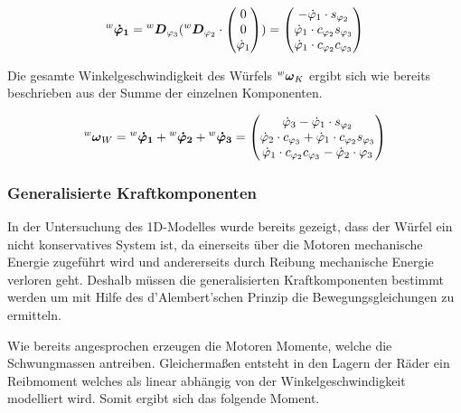 \begin{equation}
\prescript{w}{}{}\boldsymbol{\dot{\varphi}_1} = 
\prescript{w}{}{}\boldsymbol{D}_{\varphi_3} (
\prescript{w}{}{}\boldsymbol{D}_{\varphi_2} \cdot \begin{pmatrix}
 0 \\ 0 \\ \dot{\varphi}_1
\end{pmatrix} ) 
=
\begin{pmatrix}
-\dot{\varphi}_1 \cdot s_{\varphi_2}  \\
\dot{\varphi}_1 \cdot c_{\varphi_2} s_{\varphi_3} \\
\dot{\varphi}_1 \cdot c_{\varphi_2} c_{\varphi_3}
\end{pmatrix}
\end{equation}

Die gesamte Winkelgeschwindigkeit des Würfels $\prescript{w}{}{}\boldsymbol{\omega}_K$ ergibt sich wie bereits beschrieben aus der Summe der einzelnen Komponenten.

\begin{equation}
\prescript{w}{}{}\boldsymbol{\omega}_W = \prescript{w}{}{}\boldsymbol{\dot{\varphi}_1} + \prescript{w}{}{}\boldsymbol{\dot{\varphi}_2} + \prescript{w}{}{}\boldsymbol{\dot{\varphi}_3} =
\begin{pmatrix}
\dot{\varphi}_3 - \dot{\varphi}_1 \cdot s_{\varphi_2} \\
\dot{\varphi}_2 \cdot c_{\varphi_3} + \dot{\varphi}_1 \cdot c_{\varphi_2}s_{\varphi_3} \\
\dot{\varphi}_1 \cdot c_{\varphi_2}c_{\varphi_3} - \dot{\varphi}_2 \cdot{\varphi_3}
\end{pmatrix}
\end{equation}



\subsubsection{Generalisierte Kraftkomponenten}
In der Untersuchung des 1D-Modelles wurde bereits gezeigt, dass der Würfel ein nicht konservatives System ist, da einerseits über die Motoren mechanische Energie zugeführt wird und andererseits durch Reibung mechanische Energie verloren geht. Deshalb müssen die generalisierten Kraftkomponenten bestimmt werden um mit Hilfe des d'Alembert'schen Prinzip die Bewegungsgleichungen zu ermitteln.
\newline

Wie bereits angesprochen erzeugen die Motoren Momente, welche die Schwungmassen antreiben. Gleichermaßen entsteht in den Lagern der Räder ein Reibmoment welches als linear abhängig von der Winkelgeschwindigkeit modelliert wird. Somit ergibt sich das folgende Moment.

